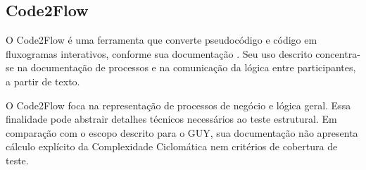 \subsection{Code2Flow}
O Code2Flow é uma ferramenta que converte pseudocódigo e código em fluxogramas interativos, conforme sua documentação \cite{code2flow}. Seu uso descrito concentra-se na documentação de processos e na comunicação da lógica entre participantes, a partir de texto.

O Code2Flow foca na representação de processos de negócio e lógica geral. Essa finalidade pode abstrair detalhes técnicos necessários ao teste estrutural. Em comparação com o escopo descrito para o GUY, sua documentação não apresenta cálculo explícito da Complexidade Ciclomática nem critérios de cobertura de teste.
